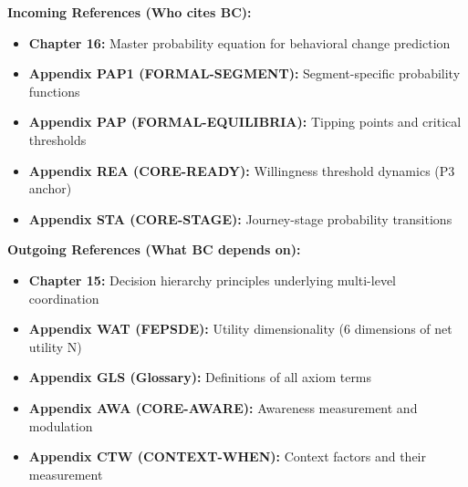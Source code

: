 \documentclass[11pt, a4paper]{article}
\begin{document}
\begin{tcolorbox}[colback=cyan!5!white, colframe=cyan!75!black, title=Cross-Reference Map]
\textbf{Incoming References (Who cites BC):}
\begin{itemize}[nosep]
    \item \textbf{Chapter 16:} Master probability equation for behavioral change prediction
    \item \textbf{Appendix PAP1 (FORMAL-SEGMENT):} Segment-specific probability functions
    \item \textbf{Appendix PAP (FORMAL-EQUILIBRIA):} Tipping points and critical thresholds
    \item \textbf{Appendix REA (CORE-READY):} Willingness threshold dynamics (P3 anchor)
    \item \textbf{Appendix STA (CORE-STAGE):} Journey-stage probability transitions
\end{itemize}

\textbf{Outgoing References (What BC depends on):}
\begin{itemize}[nosep]
    \item \textbf{Chapter 15:} Decision hierarchy principles underlying multi-level coordination
    \item \textbf{Appendix WAT (FEPSDE):} Utility dimensionality (6 dimensions of net utility N)
    \item \textbf{Appendix GLS (Glossary):} Definitions of all axiom terms
    \item \textbf{Appendix AWA (CORE-AWARE):} Awareness measurement and modulation
    \item \textbf{Appendix CTW (CONTEXT-WHEN):} Context factors and their measurement
\end{itemize}
\end{tcolorbox}

\end{document}
